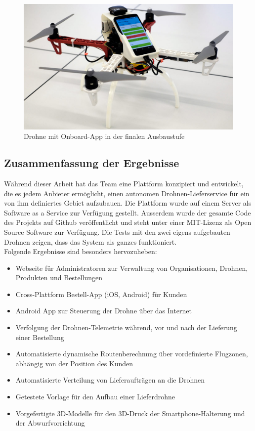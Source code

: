 \begin{figure}[H]
	\centering
	\includegraphics[width=1.0\textwidth] {images/drone.jpg}
	\caption{Drohne mit Onboard-App in der finalen Ausbaustufe}
\end{figure}



\subsection{Zusammenfassung der Ergebnisse}

Während dieser Arbeit hat das Team eine Plattform konzipiert und entwickelt, die es jedem Anbieter ermöglicht, einen autonomen Drohnen-Lieferservice für ein von ihm definiertes Gebiet aufzubauen. Die Plattform wurde auf einem Server als Software as a Service zur Verfügung gestellt. Ausserdem wurde der gesamte Code des Projekts auf Github veröffentlicht und steht unter einer \Gls{MIT-Lizenz} als Open Source Software zur Verfügung. Die Tests mit den zwei eigens aufgebauten Drohnen zeigen, dass das System als ganzes funktioniert. \\

Folgende Ergebnisse sind besonders hervozuheben:

\begin{itemize}
	\item Webseite für Administratoren zur Verwaltung von Organisationen, Drohnen, Produkten und Bestellungen
	\item Cross-Plattform Bestell-App (iOS, Android) für Kunden
	\item Android App zur Steuerung der Drohne über das Internet
	\item Verfolgung der Drohnen-Telemetrie während, vor und nach der Lieferung einer Bestellung
	\item Automatisierte dynamische Routenberechnung über vordefinierte Flugzonen, abhängig von der Position des Kunden
	\item Automatisierte Verteilung von Lieferaufträgen an die Drohnen
	\item Getestete Vorlage für den Aufbau einer Lieferdrohne
	\item Vorgefertigte 3D-Modelle für den 3D-Druck der Smartphone-Halterung und der Abwurfvorrichtung
\end{itemize}


